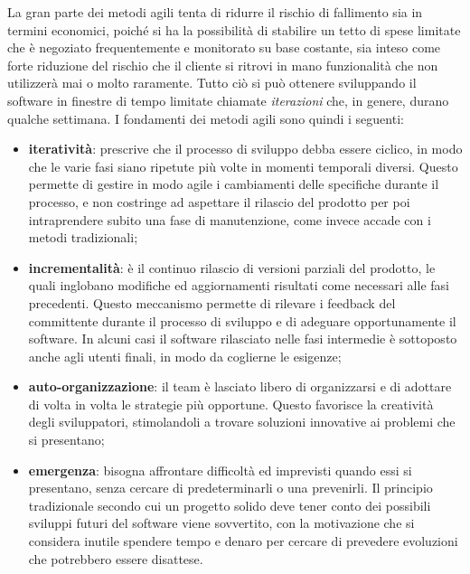 La gran parte dei metodi agili tenta di ridurre il rischio di fallimento sia in termini economici, poiché si ha la possibilità di stabilire un tetto di spese limitate che è negoziato frequentemente e monitorato su base costante, sia inteso come forte riduzione del rischio che il cliente si ritrovi in mano funzionalità che non utilizzerà mai o molto raramente. Tutto ciò si può ottenere sviluppando il software in finestre di tempo limitate chiamate \textit{iterazioni} che, in genere, durano qualche settimana.
I fondamenti dei metodi agili sono quindi i seguenti:
\begin{itemize}
\item \textbf{iteratività}: prescrive che il processo di sviluppo debba essere ciclico, in modo che le varie fasi siano ripetute più volte in momenti temporali diversi. Questo permette di gestire in modo agile i cambiamenti delle specifiche durante il processo, e non costringe ad aspettare il rilascio del prodotto per poi intraprendere subito una fase di manutenzione, come invece accade con i metodi tradizionali;
\item \textbf{incrementalità}: è il continuo rilascio di versioni parziali del prodotto, le quali inglobano modifiche ed aggiornamenti risultati come necessari alle fasi precedenti. Questo meccanismo permette di rilevare i feedback del committente durante il processo di sviluppo e di adeguare opportunamente il software. In alcuni casi il software rilasciato nelle fasi intermedie è sottoposto anche agli utenti finali, in modo da coglierne le esigenze;
\item \textbf{auto-organizzazione}: il team è lasciato libero di organizzarsi e di adottare di volta in volta le strategie più opportune. Questo favorisce la creatività degli sviluppatori, stimolandoli a trovare soluzioni innovative ai problemi che si presentano;
\item \textbf{emergenza}: bisogna affrontare difficoltà ed imprevisti quando essi si presentano, senza cercare di predeterminarli o una prevenirli. Il principio tradizionale secondo cui un progetto solido deve tener conto dei possibili sviluppi futuri del software viene sovvertito, con la motivazione che si considera inutile spendere tempo e denaro per cercare di prevedere evoluzioni che potrebbero essere disattese.
\end{itemize}

